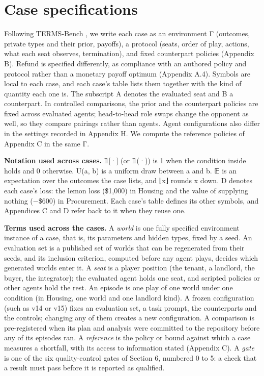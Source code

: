 \section{Case specifications}\label{case-specifications}

Following TERMS-Bench \citep{zhang2026termsbench}, we write each case as an environment Γ (outcomes, private types and their prior,
payoffs), a protocol (seats, order of play, actions, what each seat observes, termination), and fixed
counterpart policies (Appendix B). Refund is specified differently, as compliance with an authored policy and
protocol rather than a monetary payoff optimum (Appendix A.4). Symbols are local to each case, and each case's
table lists them together with the kind of quantity each one is. The subscript A denotes the evaluated seat and B a
counterpart. In controlled comparisons, the prior and the counterpart policies are fixed across evaluated agents;
head-to-head role swaps change the opponent as well, so they compare pairings rather than agents. Agent
configurations also differ in the settings recorded in Appendix H. We compute the reference policies of Appendix C
in the same Γ.

\textbf{Notation used across cases.} 𝟙{[}·{]} (or 𝟙(·)) is 1 when the condition inside holds and 0 otherwise. U(a, b) is a
uniform draw between a and b. 𝔼 is an expectation over the outcomes the case lists, and ⌊x⌋ rounds x down. D denotes
each case's loss: the lemon loss (\$1,000) in Housing and the value of supplying nothing (−\$600) in Procurement.
Each case's table defines its other symbols, and Appendices C and D refer back to it when they reuse one.

\textbf{Terms used across the cases.} A \emph{world} is one fully specified environment instance of a case, that is, its
parameters and hidden types, fixed by a seed. An evaluation set is a published set of worlds that can be
regenerated from their seeds, and its inclusion criterion, computed before any agent plays, decides which generated
worlds enter it. A \emph{seat} is a player position (the tenant, a landlord, the buyer, the integrator); the evaluated
agent holds one seat, and scripted policies or other agents hold the rest. An episode is one play of one world
under one condition (in Housing, one world and one landlord kind). A frozen configuration (such as v14 or v15) fixes
an evaluation set, a task prompt, the counterparts and the controls; changing any of them creates a new
configuration. A comparison is pre-registered when its plan and analysis were committed to the repository before any
of its episodes ran. A \emph{reference} is the policy or bound against which a case measures a shortfall, with its access
to information stated (Appendix C). A \emph{gate} is one of the six quality-control gates of Section 6, numbered 0 to 5:
a check that a result must pass before it is reported as qualified.

